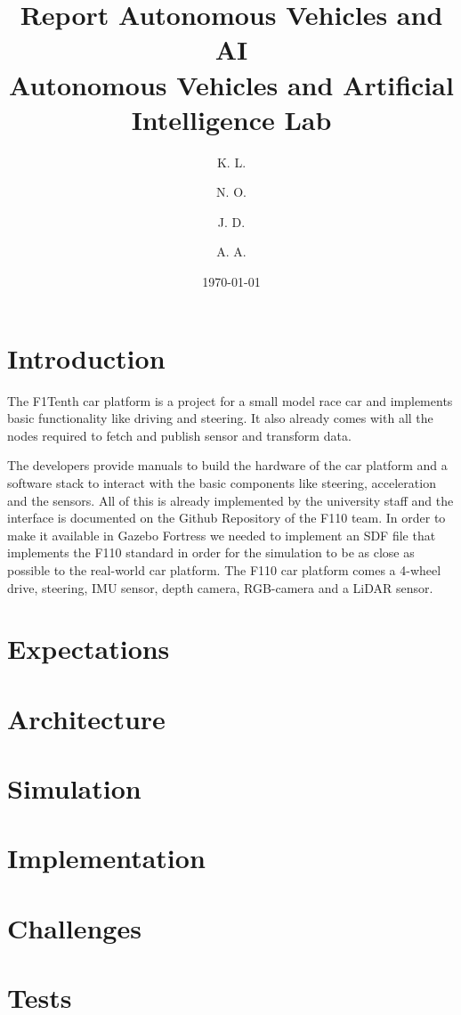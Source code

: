 \documentclass[a4paper,11pt]{article}
\title{Report Autonomous Vehicles and AI\\[1ex]
%
\large Autonomous Vehicles and Artificial Intelligence Lab}
\author{
    K. L. \\
    \and
    N. O. \\
    \and
    J. D. \\
    \and
    A. A.
}
\date{\today}
\begin{document}
\maketitle

\section{Introduction}

The F1Tenth car platform is a project for a small model race car and implements basic functionality like driving and steering. 
It also already comes with all the nodes required to fetch and publish sensor and transform data.

The developers provide manuals to build the hardware of the car platform and a software stack to interact with the basic components like steering, acceleration and the sensors. All of this is already implemented by the university staff and the interface is documented on the Github Repository of the F110 team.
In order to make it available in Gazebo Fortress we needed to implement an SDF file that implements the F110 standard in order for the simulation to be as close as possible to the real-world car platform.
The F110 car platform comes a 4-wheel drive, steering, IMU sensor, depth camera, RGB-camera and a LiDAR sensor.

\section{Expectations}


\section{Architecture}


\section{Simulation}



\section{Implementation}


\section{Challenges}

\section{Tests}




\end{document}
